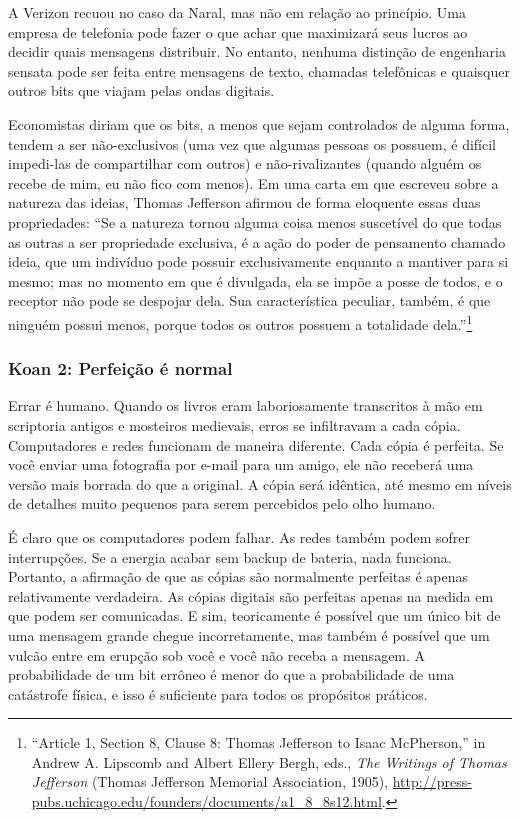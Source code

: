 A Verizon recuou no caso da Naral, mas não em relação ao princípio. Uma empresa 
de telefonia pode fazer o que achar que maximizará seus lucros ao decidir quais 
mensagens distribuir. No entanto, nenhuma distinção de engenharia sensata pode 
ser feita entre mensagens de texto, chamadas telefônicas e quaisquer outros bits 
que viajam pelas ondas digitais.

\begin{tcolorbox}[title={Exclusivos e rivais}]
Economistas diriam que os bits, a menos que sejam controlados de alguma forma, 
tendem a ser não-exclusivos (uma vez que algumas pessoas os possuem, é difícil 
impedi-las de compartilhar com outros) e não-rivalizantes (quando alguém os 
recebe de mim, eu não fico com menos). Em uma carta em que escreveu sobre a 
natureza das ideias, Thomas Jefferson afirmou de forma eloquente essas duas 
propriedades: ``Se a natureza tornou alguma coisa menos suscetível do que todas 
as outras a ser propriedade exclusiva, é a ação do poder de pensamento chamado 
ideia, que um indivíduo pode possuir exclusivamente enquanto a mantiver para si 
mesmo; mas no momento em que é divulgada, ela se impõe a posse de todos, e o 
receptor não pode se despojar dela. Sua característica peculiar, também, é que 
ninguém possui menos, porque todos os outros possuem a totalidade
dela.''\footnote{``Article 1, Section 8, Clause 8: Thomas Jefferson to Isaac
McPherson,'' in Andrew A. Lipscomb and Albert Ellery Bergh, eds., \textit{The
Writings of Thomas Jefferson} (Thomas Jefferson Memorial Association, 1905),
\url{http://press-pubs.uchicago.edu/founders/documents/a1_8_8s12.html}.}
\end{tcolorbox}


\subsubsection*{Koan 2: Perfeição é normal}
Errar é humano. Quando os livros eram laboriosamente transcritos à mão em 
scriptoria antigos e mosteiros medievais, erros se infiltravam a cada cópia. 
Computadores e redes funcionam de maneira diferente. Cada cópia é perfeita. Se 
você enviar uma fotografia por e-mail para um amigo, ele não receberá uma versão 
mais borrada do que a original. A cópia será idêntica, até mesmo em níveis de 
detalhes muito pequenos para serem percebidos pelo olho humano.

É claro que os computadores podem falhar. As redes também podem sofrer 
interrupções. Se a energia acabar sem backup de bateria, nada funciona. 
Portanto, a afirmação de que as cópias são normalmente perfeitas é apenas 
relativamente verdadeira. As cópias digitais são perfeitas apenas na medida em 
que podem ser comunicadas. E sim, teoricamente é possível que um único bit de 
uma mensagem grande chegue incorretamente, mas também é possível que um vulcão 
entre em erupção sob você e você não receba a mensagem. A probabilidade de um 
bit errôneo é menor do que a probabilidade de uma catástrofe física, e isso é 
suficiente para todos os propósitos práticos.


